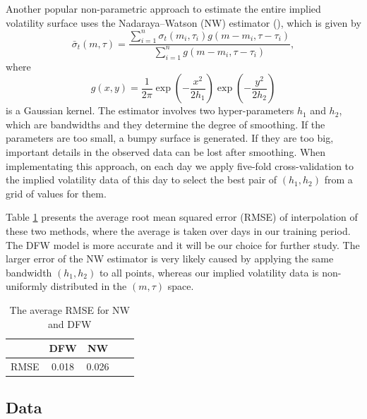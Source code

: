 \documentclass[11pt,a4paper]{article}
\theoremstyle{remark}
\begin{document}
Another popular non-parametric approach to estimate the entire implied volatility surface uses the Nadaraya–Watson (NW) estimator (\cite{hardle1990applied}), which is given by
\begin{equation} \label{nw}
\bar{\sigma}_{t}(m, \tau)=\frac{\sum_{i=1}^{n} \sigma_{t}\left(m_{i}, \tau_{i}\right) g\left(m-m_{i}, \tau-\tau_{i}\right)}{\sum_{i=1}^{n} g\left(m-m_{i}, \tau-\tau_{i}\right)},
\end{equation}
where 
\begin{equation}\label{gauss-kernel}
g(x, y)=\frac{1}{2\pi}\exp \left(-\frac{x^{2}}{2 h_{1}}\right) \exp \left(-\frac{y^{2}}{2 h_{2}}\right)
\end{equation} 
is a Gaussian kernel. The estimator involves two hyper-parameters $h_{1}$ and $h_{2}$, which are bandwidths and they determine the degree of smoothing. If the parameters are too small, a bumpy surface is generated. If they are too big, important details in the observed data can be lost after smoothing. When implementating this approach, on each day we apply five-fold cross-validation to the implied volatility data of this day to select the best pair of $(h_1,h_2)$ from a grid of values for them. 

Table \ref{table_nwdfw} presents the average root mean squared error (RMSE) of interpolation of these two methods, where the average is taken over days in our training period. The DFW model is more accurate and it will be our choice for further study. The larger error of the NW estimator is very likely caused by applying the same bandwidth $(h_1,h_2)$ to all points, whereas our implied volatility data is non-uniformly distributed in the $(m,\tau)$ space.
\begin{table}[htbp!]
	\centering
	\begin{tabular}{ccccc}
		\hline
		& DFW       & NW \\
		\hline
		RMSE       & 0.018 & 0.026 \\		
		\hline
	\end{tabular}%
	\caption{The average RMSE for NW and DFW}
	\label{table_nwdfw}%
\end{table}%

\subsection{Data}
\end{document}

